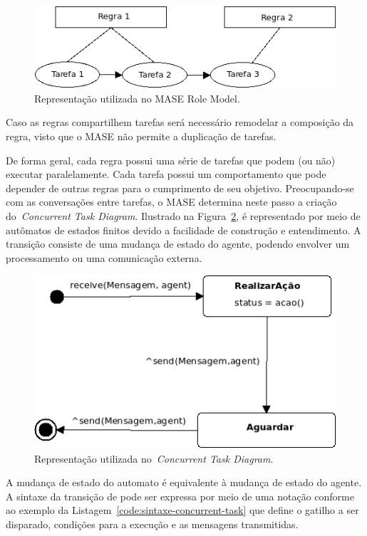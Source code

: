 \begin{figure}
	\centering
	\includegraphics[scale=0.65]{images/exemplo-mase-role-model.png}
	\caption{Representação utilizada no MASE Role Model.}
	\label{fig:exemplo-mase-role-model}
\end{figure}

Caso as regras compartilhem tarefas será necessário remodelar a composição da regra, visto que o MASE não permite a duplicação de tarefas. 

De forma geral, cada regra possui uma série de tarefas que podem (ou não) executar paralelamente. Cada tarefa possui um comportamento que pode depender de outras regras para o cumprimento de seu objetivo. Preocupando-se com as conversações entre tarefas, o MASE determina neste passo a criação do~\emph{Concurrent Task Diagram}. Ilustrado na Figura~\ref{fig:examplo-diagrama-tarefas-concorrentes}, é representado por meio de autômatos de estados finitos devido a facilidade de construção e entendimento. A transição consiste de uma mudança de estado do agente, podendo envolver um processamento ou uma comunicação externa.

\begin{figure}
	\centering
	\includegraphics[scale=0.65]{images/examplo-diagrama-tarefas-concorrentes.png}
	\caption{Representação utilizada no~\emph{Concurrent Task Diagram}.}
	\label{fig:examplo-diagrama-tarefas-concorrentes}
\end{figure}

A mudança de estado do automato é equivalente à mudança de estado do agente. A sintaxe da transição de pode ser expressa por meio de uma notação conforme ao exemplo da Listagem~\ref{code:sintaxe-concurrent-task} que define o gatilho a ser disparado, condições para a execução e as mensagens transmitidas.

